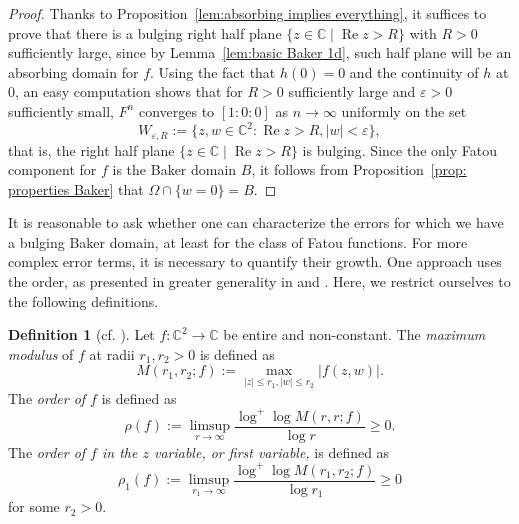 \documentclass[a4paper, 12pt, twoside]{amsart}
\theoremstyle{definition}
\newtheorem{defn}[thm]{Definition}
\numberwithin{equation}{section}
\renewcommand{\Re}{\operatorname{Re}}
\newcommand{\re}{\operatorname{Re}}
\newcommand{\C}{{\mathbb C}}
\newcommand{\ra}{\rightarrow}
\renewcommand{\epsilon}{\varepsilon}
\begin{document}
\begin{proof}
Thanks to Proposition~\ref{lem:absorbing implies everything}, it suffices to prove that there is a bulging right half plane $\{z\in\C\mid \re z >R\}$ with $R>0$ sufficiently large, since by Lemma~\ref{lem:basic Baker 1d}, such half plane will be an absorbing domain for $f$. Using the fact that $h(0)= 0$ and the continuity of $h$ at $0$, an easy computation shows that for $R>0$ sufficiently large and $\epsilon>0$ sufficiently small, $F^n$ converges to $[1:0:0]$ as $n\ra\infty$ uniformly on the set 
$$
W_{\epsilon, R}:=\{z,w\in\C^2: \Re z>R,  |w|<\epsilon\},
$$
that is, the right half plane $\{z\in\C\mid \re z >R\}$ is bulging.
Since the only Fatou component for $f$ is  the Baker domain $B$, it follows from Proposition~\ref{prop: properties Baker} that  $\Omega\cap\{w=0\}=B$.
\end{proof}

It is reasonable to ask whether one can characterize the errors for which we have a bulging Baker domain, at least for the class of Fatou functions. 
For more complex error terms, it is necessary to quantify their growth. One approach uses the order, as presented in greater generality in \cite[Chapter 3]{Ronkin1974} and \cite{Ronkin1989}. Here, we restrict ourselves to the following definitions.

\begin{defn}[cf. {\cite[Sections 1.1 and 1.2]{Ronkin1989}}]
	Let $f : \mathbb{C}^2 \to \mathbb{C}$ be entire and non-constant. The \emph{maximum modulus} of $f$ at radii $r_1, r_2 >0$ is defined as
	\begin{equation*}
		M(r_1, r_2; f) := \max_{\lvert z \rvert \leq r_1, \lvert w \rvert \leq r_2} \lvert f(z, w) \rvert.
	\end{equation*}
	The \emph{order of $f$} is defined as
	\begin{equation*}
		\rho(f) := \limsup_{r\to\infty} \frac{\log^{+} \log M(r, r; f)}{\log r} \geq 0.
	\end{equation*}
	The \emph{order of $f$ in the $z$ variable, or first variable,} is defined as
	\begin{equation*}
		\rho_1(f) := \limsup_{r_1\to\infty} \frac{\log^{+} \log M(r_1, r_2; f)}{\log r_1} \geq 0
	\end{equation*}
	for some $r_2 > 0$.
\end{defn}
\end{document}
